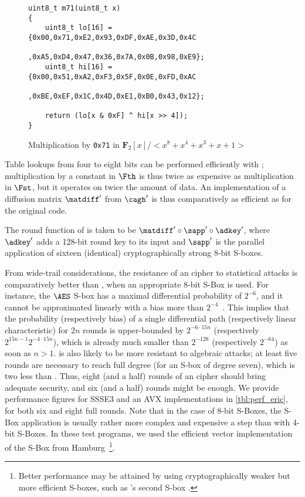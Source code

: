 \begin{figure}[!htb]
\begin{center}
\begin{verbatim}
uint8_t m71(uint8_t x)
{
    uint8_t lo[16] = {0x00,0x71,0xE2,0x93,0xDF,0xAE,0x3D,0x4C
                     ,0xA5,0xD4,0x47,0x36,0x7A,0x0B,0x98,0xE9};
    uint8_t hi[16] = {0x00,0x51,0xA2,0xF3,0x5F,0x0E,0xFD,0xAC
                     ,0xBE,0xEF,0x1C,0x4D,0xE1,0xB0,0x43,0x12};

    return (lo[x & 0xF] ^ hi[x >> 4]);
}
\end{verbatim}
\end{center}
\caption{Multiplication by \texttt{0x71} in $\mathbf{F}_{2}[x]/<x^8+x^4+x^3+x+1>$\label{lst:mulex}}
\end{figure}

Table lookups from four to eight bits can be performed efficiently with \pshufb; multiplication
by a constant in $\Fth$ is thus twice as expensive as multiplication in $\Fst$, but it operates
on twice the amount of data. An implementation of a diffusion matrix
$\matdiff'$ from $\cagh'$ is thus comparatively as efficient as for the original code. 

\medskip 

The round function of \eric is taken to be $\matdiff' \circ \sapp' \circ \adkey'$, where $\adkey'$ adds a
128-bit round key to its input and $\sapp'$ is the parallel application of sixteen (identical) cryptographically
strong 8-bit S-boxes.

From wide-trail considerations, the resistance of an \eric cipher to statistical attacks is comparatively better than \sam,
when an appropriate 8-bit S-Box is used.
For instance, the $\AES$ S-box has a maximal differential probability of $2^{-6}$, and it cannot be approximated
linearly with a bias more than $2^{-4}$~\cite{aes}.
This implies that the probability (respectively bias) of a single differential path (respectively linear characteristic)
for $2n$ rounds is upper-bounded by $2^{-6\cdot15 n}$ (respectively $2^{15n -1}2^{-4\cdot 15n}$), which is already much smaller than
$2^{-128}$ (respectively $2^{-64}$) as soon as $n > 1$.
\eric is also likely to be more resistant to algebraic attacks; at least five rounds are necessary to reach
full degree (for an S-box of degree seven), which is two less than \sam.
Thus, eight (and a half) rounds of an \eric cipher should bring adequate security, and six (and a half) rounds might be enough.
We provide performance figures for SSSE3 and an AVX implementations in \autoref{tbl:perf_eric}, for both six and eight full rounds.
Note that in the case of 8-bit S-Boxes,
the S-Box application is usually rather more complex and expensive a step than with 4-bit S-Boxes. In these test programs, we used the efficient vector
implementation of the \AES{} S-Box from Hamburg~\cite{vpaes}\footnote{Better performance may be attained by using cryptographically
weaker but more efficient S-boxes, such as \whirlpool's second S-box \cite{whirlpool}.}.

